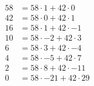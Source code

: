 \begin{align*}
	58 & = 58 \cdot 1 + 42 \cdot 0    \\
   42 & = 58 \cdot 0 + 42 \cdot 1    \\
   16 & = 58 \cdot 1 + 42 \cdot -1   \\
   10 & = 58 \cdot -2 + 42 \cdot 3   \\
   6  & = 58 \cdot 3 + 42 \cdot -4   \\
   4  & = 58 \cdot -5 + 42 \cdot 7   \\
   2  & = 58 \cdot 8 + 42 \cdot -11  \\
	0  & = 58 \cdot -21 + 42 \cdot 29 \\
\end{align*}
